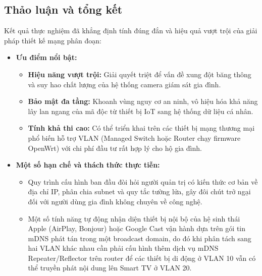 \subsection{Thảo luận và tổng kết}
\label{subsec:thao-luan-tong-ket}

Kết quả thực nghiệm đã khẳng định tính đúng đắn và hiệu quả vượt trội của giải pháp thiết kế mạng phân đoạn:
\begin{itemize}
    \item \textbf{Ưu điểm nổi bật:}
    \begin{itemize}
        \item \textbf{Hiệu năng vượt trội:} Giải quyết triệt để vấn đề xung đột băng thông và suy hao chất lượng của hệ thống camera giám sát gia đình.
        \item \textbf{Bảo mật đa tầng:} Khoanh vùng nguy cơ an ninh, vô hiệu hóa khả năng lây lan ngang của mã độc từ thiết bị IoT sang hệ thống dữ liệu cá nhân.
        \item \textbf{Tính khả thi cao:} Có thể triển khai trên các thiết bị mạng thương mại phổ biến hỗ trợ VLAN (Managed Switch hoặc Router chạy firmware OpenWrt) với chi phí đầu tư rất hợp lý cho hộ gia đình.
    \end{itemize}
    \item \textbf{Một số hạn chế và thách thức thực tiễn:}
    \begin{itemize}
        \item Quy trình cấu hình ban đầu đòi hỏi người quản trị có kiến thức cơ bản về địa chỉ IP, phân chia subnet và quy tắc tường lửa, gây đôi chút trở ngại đối với người dùng gia đình không chuyên về công nghệ.
        \item Một số tính năng tự động nhận diện thiết bị nội bộ của hệ sinh thái Apple (AirPlay, Bonjour) hoặc Google Cast vận hành dựa trên gói tin mDNS phát tán trong một broadcast domain, do đó khi phân tách sang hai VLAN khác nhau cần phải cấu hình thêm dịch vụ mDNS Repeater/Reflector trên router để các thiết bị di động ở VLAN 10 vẫn có thể truyền phát nội dung lên Smart TV ở VLAN 20.
    \end{itemize}
\end{itemize}
